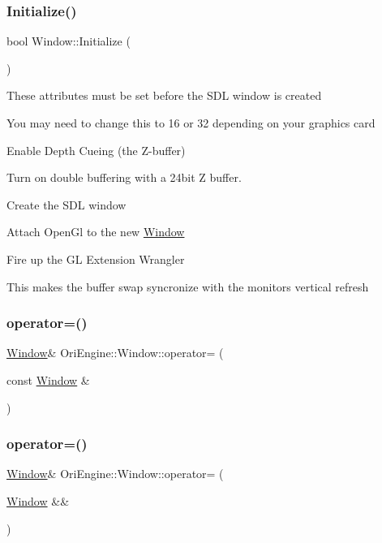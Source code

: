 \subsubsection{\texorpdfstring{Initialize()}{Initialize()}}
{\footnotesize\ttfamily bool Window\+::\+Initialize (\begin{DoxyParamCaption}{ }\end{DoxyParamCaption})}

These attributes must be set before the S\+DL window is created

You may need to change this to 16 or 32 depending on your graphics card

Enable Depth Cueing (the Z-\/buffer)

Turn on double buffering with a 24bit Z buffer.

Create the S\+DL window

Attach Open\+Gl to the new \hyperlink{class_ori_engine_1_1_window}{Window}

Fire up the GL Extension Wrangler

This makes the buffer swap syncronize with the monitor\textquotesingle{}s vertical refresh \hypertarget{class_ori_engine_1_1_window_aad30c448f70cb9f20641289765e23350}{}\label{class_ori_engine_1_1_window_aad30c448f70cb9f20641289765e23350} 
\subsubsection{\texorpdfstring{operator=()}{operator=()}\hspace{0.1cm}{\footnotesize\ttfamily [1/2]}}
{\footnotesize\ttfamily \hyperlink{class_ori_engine_1_1_window}{Window}\& Ori\+Engine\+::\+Window\+::operator= (\begin{DoxyParamCaption}\item[{const \hyperlink{class_ori_engine_1_1_window}{Window} \&}]{ }\end{DoxyParamCaption})\hspace{0.3cm}{\ttfamily [delete]}}

\hypertarget{class_ori_engine_1_1_window_a54a09c75fc36036859b93c276ca834fa}{}\label{class_ori_engine_1_1_window_a54a09c75fc36036859b93c276ca834fa} 
\subsubsection{\texorpdfstring{operator=()}{operator=()}\hspace{0.1cm}{\footnotesize\ttfamily [2/2]}}
{\footnotesize\ttfamily \hyperlink{class_ori_engine_1_1_window}{Window}\& Ori\+Engine\+::\+Window\+::operator= (\begin{DoxyParamCaption}\item[{\hyperlink{class_ori_engine_1_1_window}{Window} \&\&}]{ }\end{DoxyParamCaption})\hspace{0.3cm}{\ttfamily [delete]}}

